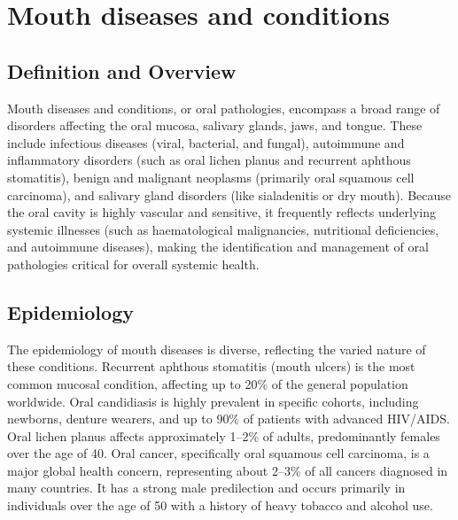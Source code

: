 \chapter{Mouth diseases and conditions}

\section*{Definition and Overview}
Mouth diseases and conditions, or oral pathologies, encompass a broad range of disorders affecting the oral mucosa, salivary glands, jaws, and tongue. These include infectious diseases (viral, bacterial, and fungal), autoimmune and inflammatory disorders (such as oral lichen planus and recurrent aphthous stomatitis), benign and malignant neoplasms (primarily oral squamous cell carcinoma), and salivary gland disorders (like sialadenitis or dry mouth). Because the oral cavity is highly vascular and sensitive, it frequently reflects underlying systemic illnesses (such as haematological malignancies, nutritional deficiencies, and autoimmune diseases), making the identification and management of oral pathologies critical for overall systemic health.

\section*{Epidemiology}
The epidemiology of mouth diseases is diverse, reflecting the varied nature of these conditions. Recurrent aphthous stomatitis (mouth ulcers) is the most common mucosal condition, affecting up to 20\% of the general population worldwide. Oral candidiasis is highly prevalent in specific cohorts, including newborns, denture wearers, and up to 90\% of patients with advanced HIV/AIDS. Oral lichen planus affects approximately 1--2\% of adults, predominantly females over the age of 40. Oral cancer, specifically oral squamous cell carcinoma, is a major global health concern, representing about 2--3\% of all cancers diagnosed in many countries. It has a strong male predilection and occurs primarily in individuals over the age of 50 with a history of heavy tobacco and alcohol use.

